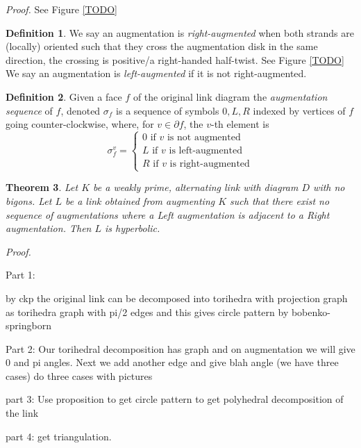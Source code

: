 \documentclass[11pt]{amsart}
\theoremstyle{plain}
\newtheorem{theorem}{Theorem}[section]
\theoremstyle{definition}
\newtheorem{define}[theorem]{Definition}
\begin{document}
{\it Proof.} See Figure \ref{TODO}

\begin{define}
We say an augmentation is \emph{right-augmented} when both strands are (locally) oriented such that they cross the augmentation disk in the same direction, the crossing is positive/a right-handed half-twist. See Figure \ref{TODO}
We say an augmentation is \emph{left-augmented} if it is not right-augmented.
\end{define}

\begin{define}
Given a face $f$ of the original link diagram the \emph{augmentation sequence} of $f$, denoted $\sigma_f$ is a sequence of symbols $0, L, R$ indexed by vertices of $f$ going counter-clockwise, where, for $v \in \partial f$, the $v$-th element is
\[
\sigma_f^v = 
\begin{cases}
0 \text{ if $v$ is not augmented} \\
L \text{ if $v$ is left-augmented} \\
R \text{ if $v$ is right-augmented}
\end{cases}
\]
\end{define}

\begin{theorem}
Let $K$ be a weakly prime, alternating link with diagram $D$ with no bigons. Let $L$ be a link obtained from augmenting $K$ such that there exist no sequence of augmentations where a Left augmentation is adjacent to a Right augmentation. Then $L$ is hyperbolic.
\end{theorem}

{\it Proof.}

Part 1:  


by ckp the original link can be decomposed into torihedra with projection graph as torihedra graph with pi/2 edges and this gives circle pattern by bobenko-springborn

Part 2: Our torihedral decomposition has graph and on augmentation we will give 0 and pi angles. Next we add another edge and give blah angle (we have three cases)
do three cases with pictures

part 3: Use proposition to get circle pattern to get polyhedral decomposition of the link 

part 4: get triangulation.  



\end{document}
